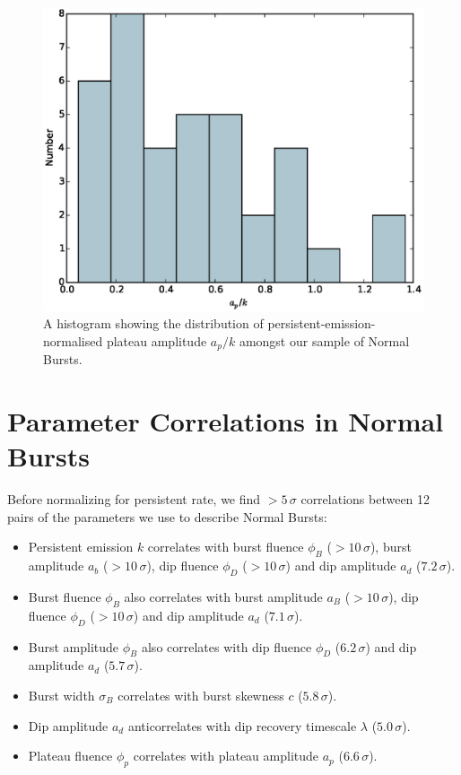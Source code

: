 \begin{figure}
  \centering
  \includegraphics[width=.9\linewidth, trim={0cm 0 0cm 0},clip]{images/appendix_plat_pa_n_hist.eps}
  \caption{\small A histogram showing the distribution of persistent-emission-normalised plateau amplitude $a_p/k$ amongst our sample of Normal Bursts.}
  \label{fig:app_hist_ap_n}
\end{figure}

\section{Parameter Correlations in Normal Bursts}
\label{app:corr}

\par Before normalizing for persistent rate, we find $>5\,\sigma$ correlations between 12 pairs of the parameters we use to describe Normal Bursts:

\begin{itemize}
\item Persistent emission $k$ correlates with burst fluence $\phi_B$ ($>10\,\sigma$), burst amplitude $a_b$ ($>10\,\sigma$), dip fluence $\phi_D$ ($>10\,\sigma$) and dip amplitude $a_d$ ($7.2\,\sigma$).
\item Burst fluence $\phi_B$ also correlates with burst amplitude $a_B$ ($>10\,\sigma$), dip fluence $\phi_D$ ($>10\,\sigma$) and dip amplitude $a_d$ ($7.1\,\sigma$).
\item Burst amplitude $\phi_B$ also correlates with dip fluence $\phi_D$ ($6.2\,\sigma$) and dip amplitude $a_d$ ($5.7\,\sigma$).
\item Burst width $\sigma_B$ correlates with burst skewness $c$ ($5.8\,\sigma$).
\item Dip amplitude $a_d$ anticorrelates with dip recovery timescale $\lambda$ ($5.0\,\sigma$).
\item Plateau fluence $\phi_p$ correlates with plateau amplitude $a_p$ ($6.6\,\sigma$).
\end{itemize}

